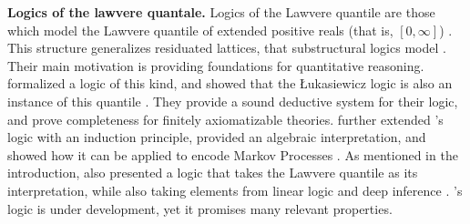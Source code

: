 \textbf{Logics of the lawvere quantale.} Logics of the Lawvere quantile are those which model the Lawvere quantile of extended positive reals (that is, $[0,\infty]$)  \citep{bacci2023propositional}. This structure generalizes residuated lattices, that substructural logics model \citep{galatos2007residuated}. Their main motivation is providing foundations for quantitative reasoning. \citeauthor{bacci2023propositional} formalized a logic of this kind, and showed that the Łukasiewicz logic is also an instance of this quantile \citep{bacci2023propositional, bacci2024polynomial}. They provide a sound deductive system for their logic, and prove completeness for finitely axiomatizable theories. \citeauthor{bacci2025induction} further extended \citeauthor{bacci2024polynomial}'s logic with an induction principle, provided an algebraic interpretation, and showed how it can be applied to encode Markov Processes \citep{bacci2025induction}. As mentioned in the introduction, \citeauthor{capucci2024quantifiers} also presented a logic that takes the Lawvere quantile as its interpretation, while also taking elements from linear logic \citep{Wadler1993, agliano2025algebraic} and deep inference \citep{guglielmi2015deep, guglielmi2007system}. \citeauthor{capucci2024quantifiers}'s logic is under development, yet it promises many relevant properties. 









\begin{comment}
\jnote{\\
Negation: involutive, non-increasing, Bound-constrains,
Additive and multplicative? Con and dis : Associativity, commutativity, monotonicity, idemopotency, distributivity, identity, monotonicity, strict monotonicity, continuity, left-continuity\\
s-implications and r-implication: exchange principle, left antinocity, right istonicity, boundary conditions, normality condition, e-degree ranking (residuation is more general?), left neutrality, law of contraposition, residuum. 
Other: prelinearity}
    
\end{comment}

